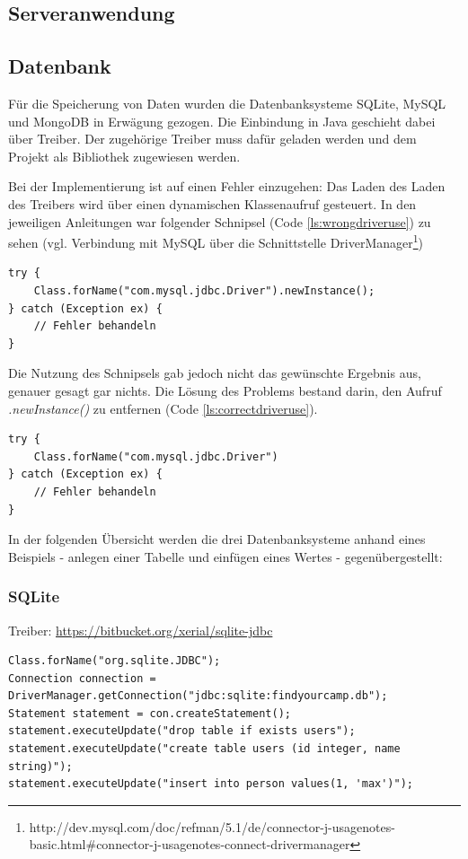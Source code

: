 \subsection{Serveranwendung}

\subsection{Datenbank}

Für die Speicherung von Daten wurden die Datenbanksysteme SQLite, MySQL und MongoDB in Erwägung gezogen. Die Einbindung in Java geschieht dabei über Treiber. Der zugehörige Treiber  muss dafür geladen werden und dem Projekt als Bibliothek zugewiesen werden.

Bei der Implementierung ist auf einen Fehler einzugehen: Das Laden des Laden des Treibers wird über einen dynamischen Klassenaufruf gesteuert. In den jeweiligen Anleitungen war folgender Schnipsel (Code \ref{ls:wrongdriveruse}) zu sehen (vgl. Verbindung mit MySQL über die Schnittstelle DriverManager\footnote{http://dev.mysql.com/doc/refman/5.1/de/connector-j-usagenotes-basic.html\#connector-j-usagenotes-connect-drivermanager})

\begin{lstlisting}[label=ls:wrongdriveruse,caption=Fehlerhafter dynamischer Klassenaufruf]
try {
	Class.forName("com.mysql.jdbc.Driver").newInstance();
} catch (Exception ex) {
	// Fehler behandeln
}
\end{lstlisting}

Die Nutzung des Schnipsels gab jedoch nicht das gewünschte Ergebnis aus, genauer gesagt gar nichts. Die Lösung des Problems bestand darin, den Aufruf \textit{.newInstance()} zu entfernen (Code \ref{ls:correctdriveruse}).

\begin{lstlisting}[label=ls:correctdriveruse,caption=Korrekter dynamischer Klassenaufruf]
try {
	Class.forName("com.mysql.jdbc.Driver")
} catch (Exception ex) {
	// Fehler behandeln
}
\end{lstlisting}

In der folgenden Übersicht werden die drei Datenbanksysteme anhand eines Beispiels - anlegen einer Tabelle und einfügen eines Wertes - gegenübergestellt:

\subsubsection{SQLite}

Treiber: \url{https://bitbucket.org/xerial/sqlite-jdbc}
\begin{lstlisting}[label=ls:mysqlexample,caption=Exemplarische Darstellung der Nutzung des SQLite Treibers]
Class.forName("org.sqlite.JDBC");
Connection connection = DriverManager.getConnection("jdbc:sqlite:findyourcamp.db");
Statement statement = con.createStatement();
statement.executeUpdate("drop table if exists users");
statement.executeUpdate("create table users (id integer, name string)");
statement.executeUpdate("insert into person values(1, 'max')");
\end{lstlisting}

